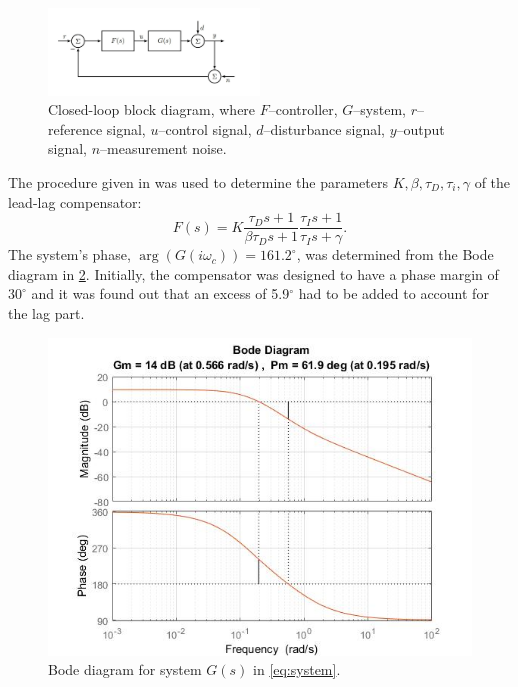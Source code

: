 \documentclass[a4paper]{article}
\begin{document}
\begin{figure}[!ht]
	\begin{center}
		\includegraphics[width=0.5\textwidth]{system}
	\end{center}
	\caption{Closed-loop block diagram, where $F$--controller, $G$--system, $r$--reference signal, $u$--control signal, $d$--disturbance signal, $y$--output signal, $n$--measurement noise.}
	\label{fig:block_diagram}
\end{figure}

The procedure given in \cite{basic_book} was used to determine the parameters $K, \beta, \tau_D, \tau_i, \gamma$ of the lead-lag compensator:
\begin{equation}
	F(s) = K \frac{\tau_D s + 1}{\beta \tau_D s + 1} \frac{\tau_I s + 1}{\tau_I s + \gamma}.
	\label{eq:lead_lag}
\end{equation}
The system's phase, $\arg(G(i\omega_c)) = 161.2^\circ$, was determined from the Bode diagram in \cref{fig:bode_diagram}. Initially, the compensator was designed to have a phase margin of $30^\circ$ and it was found out that an excess of 5.9$^\circ$ had to be added to account for the lag part.

\begin{figure}[!ht]
	\begin{center}
		\includegraphics[width=.8\linewidth]{bodeG}
	\end{center}
	\caption{Bode diagram for system $G(s)$ in \eqref{eq:system}.}
	\label{fig:bode_diagram}
\end{figure}
\end{document}
